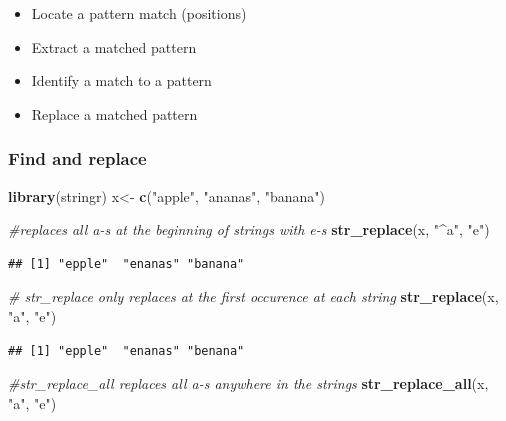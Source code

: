 \documentclass[]{book}
\newenvironment{Shaded}{\begin{snugshade}}{\end{snugshade}}
\newcommand{\KeywordTok}[1]{\textcolor[rgb]{0.13,0.29,0.53}{\textbf{#1}}}
\newcommand{\StringTok}[1]{\textcolor[rgb]{0.31,0.60,0.02}{#1}}
\newcommand{\CommentTok}[1]{\textcolor[rgb]{0.56,0.35,0.01}{\textit{#1}}}
\newcommand{\NormalTok}[1]{#1}
\providecommand{\tightlist}{%
  \setlength{\itemsep}{0pt}\setlength{\parskip}{0pt}}
\begin{document}
\begin{itemize}
\tightlist
\item
  Locate a pattern match (positions)
\item
  Extract a matched pattern
\item
  Identify a match to a pattern
\item
  Replace a matched pattern
\end{itemize}

\subsubsection{Find and replace}\label{find-and-replace}

\begin{Shaded}
\begin{Highlighting}[]
\KeywordTok{library}\NormalTok{(stringr)}
\NormalTok{x<-}\StringTok{ }\KeywordTok{c}\NormalTok{(}\StringTok{"apple"}\NormalTok{, }\StringTok{"ananas"}\NormalTok{, }\StringTok{"banana"}\NormalTok{)}

\CommentTok{#replaces all a-s at the beginning of strings with e-s}
\KeywordTok{str_replace}\NormalTok{(x, }\StringTok{"^a"}\NormalTok{, }\StringTok{"e"}\NormalTok{) }
\end{Highlighting}
\end{Shaded}

\begin{verbatim}
## [1] "epple"  "enanas" "banana"
\end{verbatim}

\begin{Shaded}
\begin{Highlighting}[]
\CommentTok{# str_replace only replaces at the first occurence at each string}
\KeywordTok{str_replace}\NormalTok{(x, }\StringTok{"a"}\NormalTok{, }\StringTok{"e"}\NormalTok{) }
\end{Highlighting}
\end{Shaded}

\begin{verbatim}
## [1] "epple"  "enanas" "benana"
\end{verbatim}

\begin{Shaded}
\begin{Highlighting}[]
\CommentTok{#str_replace_all replaces all a-s anywhere in the strings}
\KeywordTok{str_replace_all}\NormalTok{(x, }\StringTok{"a"}\NormalTok{, }\StringTok{"e"}\NormalTok{) }
\end{Highlighting}
\end{Shaded}
\end{document}
